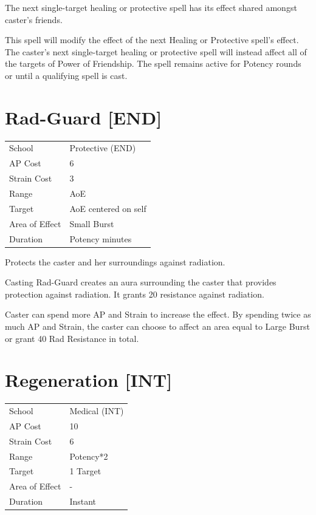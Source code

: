 \documentclass[11pt,a4paper,twocolumn]{book}
\begin{document}
\medskip

The next single-target healing or protective spell has its effect shared amongst caster's friends.

This spell will modify the effect of the next Healing or Protective spell's effect. The caster's next single-target healing or protective spell will instead affect all of the targets of Power of Friendship. The spell remains active for Potency rounds or until a qualifying spell is cast.


\section*{Rad-Guard [END]}
{
	\begin{tabu} to 75mm{| X[l,4] | X[l,7] |}
		\hline
		School 			& Protective (END) 			\\
        AP Cost	      	& 6 						\\
        Strain Cost     & 3 						\\
        Range     		& AoE						\\
        Target      	& AoE centered on self		\\
        Area of Effect  & Small Burst  	 			\\
        Duration     	& Potency minutes			\\ \hline
	\end{tabu}
		
}

\medskip

Protects the caster and her surroundings against radiation.

Casting Rad-Guard creates an aura surrounding the caster that provides protection against radiation. It grants 20 resistance against radiation.

Caster can spend more AP and Strain to increase the effect. By spending twice as much AP and Strain, the caster can choose to affect an area equal to Large Burst or grant 40 Rad Resistance in total.


\section*{Regeneration [INT]}
{
	\begin{tabu} to 75mm{| X[l,4] | X[l,7] |}
		\hline
		School 			& Medical (INT) 		\\
        AP Cost	      	& 10 					\\
        Strain Cost     & 6 					\\
        Range     		& Potency*2				\\
        Target      	& 1 Target				\\
        Area of Effect  & -  	 				\\
        Duration     	& Instant				\\ \hline
	\end{tabu}
		
}
\end{document}
